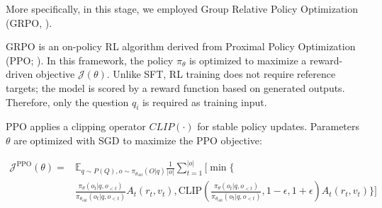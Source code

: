 More specifically, in this stage, we employed Group Relative Policy Optimization (GRPO, \cite{shao2024deepseekmath}).

GRPO is an on-policy RL algorithm derived from Proximal Policy Optimization (PPO; \cite{schulman2017proximal}). In this framework, the policy $\pi_\theta$ is optimized to maximize a reward-driven objective $\mathcal{J}(\theta)$. Unlike SFT, RL training does not require reference targets; the model is scored by a reward function based on generated outputs. Therefore, only the question $q_i$ is required as training input.


PPO applies a clipping operator $CLIP(\cdot)$ for stable policy updates. Parameters $\theta$ are optimized with SGD to maximize the PPO objective:




\begin{footnotesize}
    \begin{equation}
        \begin{split}
            \mathcal{J}^{\text{PPO}}(\theta) =
             &\mathbb{E}_{q\sim P(Q), o\sim\pi_{\theta_{\text{old}}}(O|q)}\frac{1}{|o|}\sum_{t=1}^{|o|}\Bigg[\min\Bigg\{ \\
             &\frac{\pi_{\theta}(o_t | q, o_{<t})}{\pi_{\theta_{\text{old}}}(o_t | q, o_{<t})} A_t(r_t, v_t), \text{CLIP}\left(\frac{\pi_{\theta}(o_t | q, o_{<t})}{\pi_{\theta_{\text{old}}}(o_t | q, o_{<t})}, 1 - \epsilon, 1+\epsilon\right)A_t(r_t, v_t)\Bigg\}\Bigg]
        \end{split}
    \end{equation}
\end{footnotesize}



